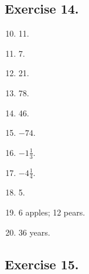 \documentclass{book}
\begin{document}
\subsection*{Exercise 14.} \begin{enumerate}
\setcounter{enumi}{9}

\item 11.

\item 7.

\item 21.

\item 78.

\item 46.

\item $-74$.

\item $-1\frac{1}{3}$.

\item $-4\frac{1}{4}$.

\item 5.

\item 6 apples; 12 pears.

\item 36 years.

\end{enumerate}

\subsection*{Exercise 15.}
\end{document}
